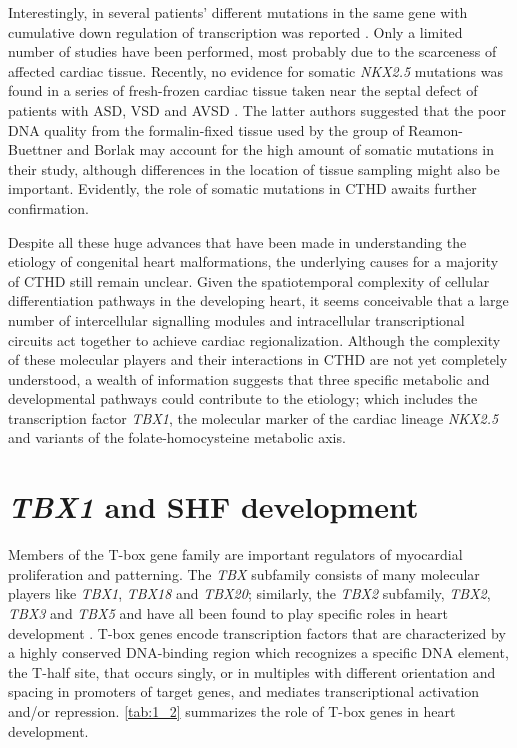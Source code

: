 \begin{refsection}
Interestingly, in several patients’ different mutations in the same gene with cumulative down regulation of transcription was reported \cite{reamon2006bridging,reamon2006hey2,reamon2004tbx5,reamon2004novel,reamon2004somatic,reamon2006somatic,reamon2008loss}. Only a limited number of studies have been performed, most probably due to the scarceness of affected cardiac tissue. Recently, no evidence for somatic \textit{NKX2.5} mutations was found in a series of fresh-frozen cardiac tissue taken near the septal defect of patients with ASD, VSD and AVSD \cite{draus2009investigation}. The latter authors suggested that the poor DNA quality from the formalin-fixed tissue used by the group of Reamon-Buettner and Borlak may account for the high amount of somatic mutations in their study, although differences in the location of tissue sampling might also be important. Evidently, the role of somatic mutations in CTHD awaits further confirmation.

Despite all these huge advances that have been made in understanding the etiology of congenital heart malformations, the underlying causes for a majority of CTHD still remain unclear. Given the spatiotemporal complexity of cellular differentiation pathways in the developing heart, it seems conceivable that a large number of intercellular signalling modules and intracellular transcriptional circuits act together to achieve cardiac regionalization. Although the complexity of these molecular players and their interactions in CTHD are not yet completely understood, a wealth of information suggests that three specific metabolic and developmental pathways could contribute to the etiology; which includes the transcription factor \textit{TBX1}, the molecular marker of the cardiac lineage \textit{NKX2.5} and variants of the folate-homocysteine metabolic axis.

\section{\textit{TBX1} and SHF development}



Members of the T-box gene family are important regulators of myocardial proliferation and patterning. The \textit{TBX} subfamily consists of many molecular players like \textit{TBX1}, \textit{TBX18} and \textit{TBX20}; similarly, the \textit{TBX2} subfamily, \textit{TBX2}, \textit{TBX3} and \textit{TBX5} and have all been found to play specific roles in heart development \cite{naiche2005t,plageman2005t,stennard2005t,merscher2001tbx1}. T-box genes encode transcription factors that are characterized by a highly conserved DNA-binding region which recognizes a specific DNA element, the T-half site, that occurs singly, or in multiples with different orientation and spacing in promoters of target genes, and mediates transcriptional activation and/or repression. \cref{tab:1_2} summarizes the role of T-box genes in heart development.


\end{refsection}
